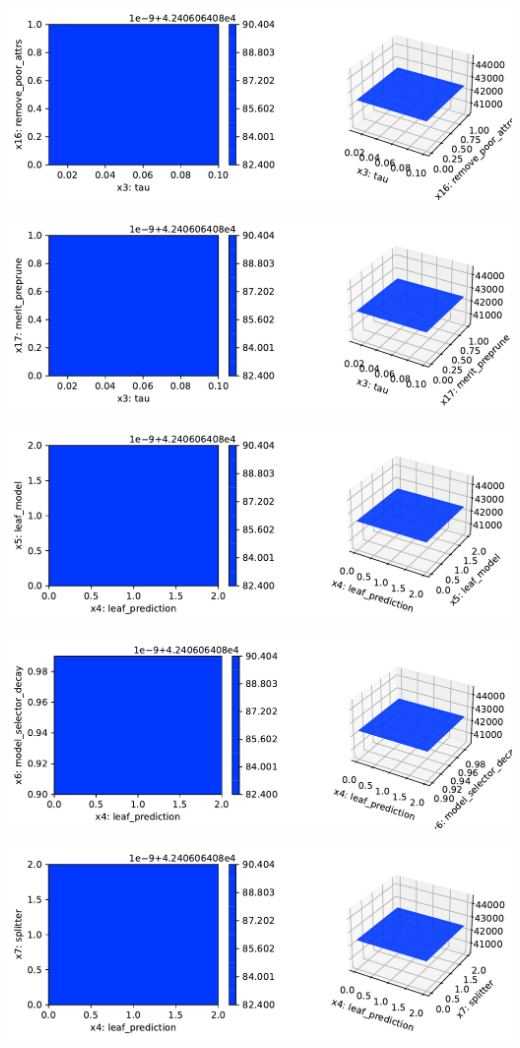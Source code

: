 \documentclass[
  letterpaper,
  DIV=11,
  numbers=noendperiod]{scrreprt}
\begin{document}
\includegraphics{024_spot_hpt_river_friedman_hatr_files/figure-pdf/cell-42-output-50.pdf}

\includegraphics{024_spot_hpt_river_friedman_hatr_files/figure-pdf/cell-42-output-51.pdf}

\includegraphics{024_spot_hpt_river_friedman_hatr_files/figure-pdf/cell-42-output-52.pdf}

\includegraphics{024_spot_hpt_river_friedman_hatr_files/figure-pdf/cell-42-output-53.pdf}

\includegraphics{024_spot_hpt_river_friedman_hatr_files/figure-pdf/cell-42-output-54.pdf}
\end{document}
